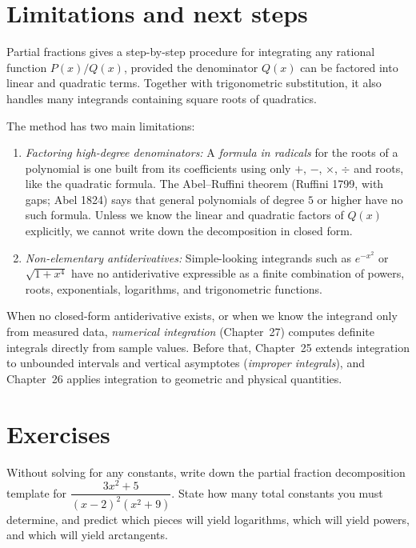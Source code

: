 \section{Limitations and next steps}
\label{ch24:road-ahead}

\begin{connectionbox}
Partial fractions gives a step-by-step procedure for integrating any rational function
$P(x)/Q(x)$, provided the denominator $Q(x)$ can be factored into linear and quadratic terms.
Together with trigonometric substitution, it also handles many integrands containing
square roots of quadratics.

The method has two main limitations:
\begin{enumerate}
  \item \emph{Factoring high-degree denominators:} A \emph{formula in radicals}
  for the roots of a polynomial is one built from its coefficients using only
  $+$, $-$, $\times$, $\div$ and roots, like the quadratic formula. The
  Abel--Ruffini theorem (Ruffini 1799, with gaps; Abel 1824) says
  that general polynomials of degree $5$ or higher have no such formula. Unless
  we know the linear and quadratic factors of $Q(x)$ explicitly, we cannot
  write down the decomposition in closed form.
  \item \emph{Non-elementary antiderivatives:} Simple-looking integrands such as $e^{-x^2}$
  or $\sqrt{1+x^4}$ have no antiderivative expressible as a finite combination of powers,
  roots, exponentials, logarithms, and trigonometric functions.
\end{enumerate}

When no closed-form antiderivative exists, or when we know the integrand only from
measured data, \emph{numerical integration} (Chapter~27) computes definite integrals
directly from sample values. Before that, Chapter~25 extends integration to unbounded intervals
and vertical asymptotes (\emph{improper integrals}), and Chapter~26 applies integration
to geometric and physical quantities.
\end{connectionbox}

\section{Exercises}
\label{ch24:exercises}

\begin{exercise}
Without solving for any constants, write down the partial fraction decomposition template
for $\dfrac{3x^2 + 5}{(x-2)^2(x^2+9)}$. State how many total constants you must determine,
and predict which pieces will yield logarithms, which will yield powers, and which will
yield arctangents.
\end{exercise}

